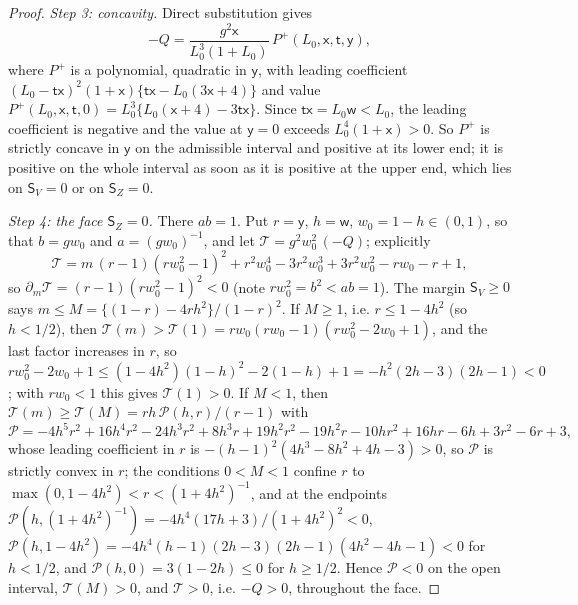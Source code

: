 \documentclass[11pt]{article}
\theoremstyle{remark}
\begin{document}
\begin{proof}
\emph{Step 3: concavity.}  Direct substitution gives
\[
 -Q=\frac{g^2\mathsf x}{L_0^3(1+L_0)}\,P^+(L_0,\mathsf x,\mathsf t,\mathsf y),
\]
where $P^+$ is a polynomial, quadratic in $\mathsf y$, with leading
coefficient $(L_0-\mathsf t\mathsf x)^2(1+\mathsf x)\{\mathsf t\mathsf x-L_0(3\mathsf x+4)\}$
and value $P^+(L_0,\mathsf x,\mathsf t,0)=L_0^3\{L_0(\mathsf x+4)-3\mathsf t\mathsf x\}$.
Since $\mathsf t\mathsf x=L_0\mathsf w<L_0$, the leading coefficient is
negative and the value at $\mathsf y=0$ exceeds $L_0^4(1+\mathsf x)>0$.
So $P^+$ is strictly concave in $\mathsf y$ on the admissible interval and
positive at its lower end; it is positive on the whole interval as soon as
it is positive at the upper end, which lies on $\mathsf S_V=0$ or on
$\mathsf S_Z=0$.

\emph{Step 4: the face $\mathsf S_Z=0$.}  There $ab=1$.  Put
$r=\mathsf y$, $h=\mathsf w$, $w_0=1-h\in(0,1)$, so that $b=gw_0$ and
$a=(gw_0)^{-1}$, and let $\mathcal T=g^2w_0^2\,(-Q)$; explicitly
\[
 \mathcal T=m\,(r-1)(rw_0^2-1)^2
 +r^2w_0^4-3r^2w_0^3+3r^2w_0^2-rw_0-r+1,
\]
so $\partial_m\mathcal T=(r-1)(rw_0^2-1)^2<0$ (note $rw_0^2=b^2<ab=1$).
The margin $\mathsf S_V\ge0$ says $m\le M=\{(1-r)-4rh^2\}/(1-r)^2$.  If
$M\ge1$, i.e. $r\le1-4h^2$ (so $h<1/2$), then
$\mathcal T(m)>\mathcal T(1)=rw_0(rw_0-1)(rw_0^2-2w_0+1)$, and the last
factor increases in $r$, so
$rw_0^2-2w_0+1\le(1-4h^2)(1-h)^2-2(1-h)+1=-h^2(2h-3)(2h-1)<0$; with
$rw_0<1$ this gives $\mathcal T(1)>0$.  If $M<1$, then
$\mathcal T(m)\ge\mathcal T(M)=rh\,\mathcal P(h,r)/(r-1)$ with
\[
 \mathcal P=-4h^5r^2+16h^4r^2-24h^3r^2+8h^3r+19h^2r^2-19h^2r
 -10hr^2+16hr-6h+3r^2-6r+3 ,
\]
whose leading coefficient in $r$ is $-(h-1)^2(4h^3-8h^2+4h-3)>0$, so
$\mathcal P$ is strictly convex in $r$; the conditions $0<M<1$ confine
$r$ to $\max(0,1-4h^2)<r<(1+4h^2)^{-1}$, and at the endpoints
$\mathcal P(h,(1+4h^2)^{-1})=-4h^4(17h+3)/(1+4h^2)^2<0$,
$\mathcal P(h,1-4h^2)=-4h^4(h-1)(2h-3)(2h-1)(4h^2-4h-1)<0$ for $h<1/2$,
and $\mathcal P(h,0)=3(1-2h)\le0$ for $h\ge1/2$.  Hence $\mathcal P<0$ on
the open interval, $\mathcal T(M)>0$, and $\mathcal T>0$, i.e. $-Q>0$,
throughout the face.


\end{proof}
\end{document}
